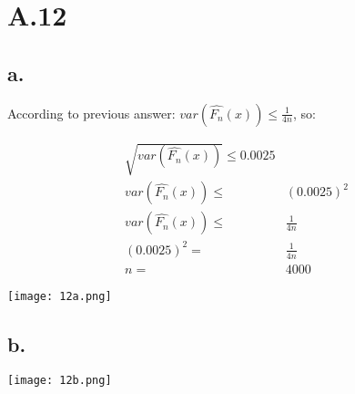 \documentclass{article}
\begin{document}
\section{A.12}
\subsection{a.}
According to previous answer: $var(\hat{F_n}(x))\le\frac{1}{4n}$, so:

\begin{equation}
\begin{split}
\sqrt{var(\hat{F_n}(x))}\le 0.0025 \\
var(\hat{F_n}(x)) \le & (0.0025)^2 \\
var(\hat{F_n}(x)) \le & \frac{1}{4n} \\
(0.0025)^2 = & \frac{1}{4n} \\ 
n = & 4000
\end{split}
\end{equation}

\texttt{[image: 12a.png]}

\subsection{b.}
\texttt{[image: 12b.png]}
\end{document}

